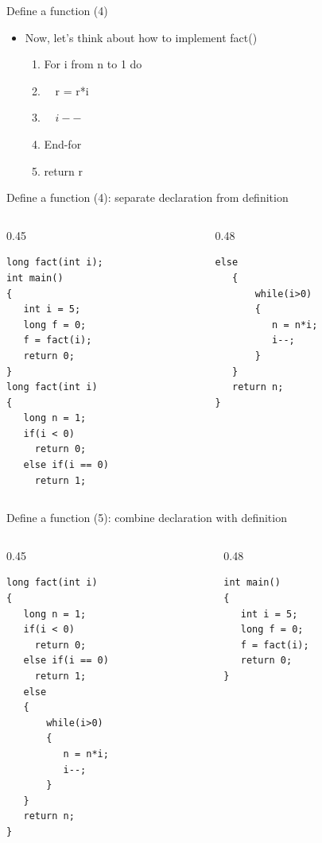 \begin{frame}[fragile]{Define a function (4)}
\begin{itemize}
	\item {Now, let's think about how to implement fact()}
	\begin{enumerate}
		\item {For i from n to 1 do}
		\item {~~r = r*i}
		\item {~~$i--$}
		\item {End-for}
		\item {return r}
	\end{enumerate}
\end{itemize}

\end{frame}

\begin{frame}[fragile]{Define a function (4): separate declaration from definition}
\vspace{-0.2in}
\begin{columns}
\begin{column}{0.45\linewidth}
\begin{lstlisting}
long fact(int i); 
int main()
{
   int i = 5;
   long f = 0;
   f = fact(i);
   return 0; 
}
long fact(int i)
{
   long n = 1;
   if(i < 0)
     return 0;
   else if(i == 0)
     return 1;

\end{lstlisting}
\end{column}
\begin{column}{0.48\linewidth}
\begin{lstlisting}[firstnumber=16]
   else
   {
       while(i>0)
       {
          n = n*i;
          i--;
       }
   }
   return n;
}

\end{lstlisting}
\end{column}
\end{columns}
\end{frame}

\begin{frame}[fragile]{Define a function (5): combine declaration with definition}
\vspace{-0.2in}
\begin{columns}
\begin{column}{0.45\linewidth}
\begin{lstlisting}
long fact(int i)
{
   long n = 1;
   if(i < 0)
     return 0;
   else if(i == 0)
     return 1;
   else
   {
       while(i>0)
       {
          n = n*i;
          i--;
       }
   }
   return n;
}
\end{lstlisting}
\end{column}
\begin{column}{0.48\linewidth}
\begin{lstlisting}[firstnumber=18]
int main()
{
   int i = 5;
   long f = 0;
   f = fact(i);
   return 0; 
}

\end{lstlisting}
\end{column}
\end{columns}
\end{frame}

